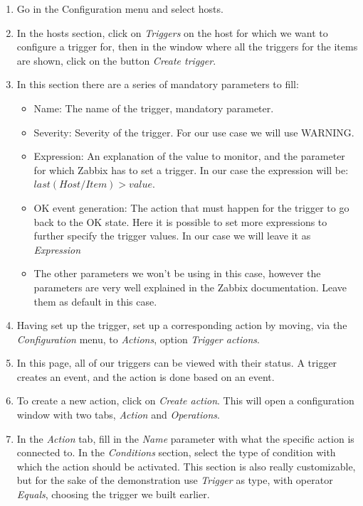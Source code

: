\documentclass[a4paper,11pt]{scrartcl}
\begin{document}
\begin{enumerate}
    \item Go in the Configuration menu and select hosts.
    \item In the hosts section, click on \textit{Triggers} on the host for which we want to configure a trigger for, then in the window where all the triggers for the items are shown, click on the button \textit{Create trigger}.
    \item In this section there are a series of mandatory parameters to fill:
    \begin{itemize}
        \item Name: The name of the trigger, mandatory parameter.
        \item Severity: Severity of the trigger. For our use case we will use WARNING.
        \item Expression: An explanation of the value to monitor, and the parameter for which Zabbix has to set a trigger. In our case the expression will be: $last(Host/Item)>value$. 
        \item OK event generation: The action that must happen for the trigger to go back to the OK state. Here it is possible to set more expressions to further specify the trigger values. In our case we will leave it as \textit{Expression}
        \item The other parameters we won't be using in this case, however the parameters are very well explained in the Zabbix documentation. Leave them as default in this case.
    \end{itemize}
    \item Having set up the trigger, set up a corresponding action by moving, via the \textit{Configuration} menu, to \textit{Actions}, option \textit{Trigger actions}.
    \item In this page, all of our triggers can be viewed with their status. A trigger creates an event, and the action is done based on an event.
    \item To create a new action, click on \textit{Create action}. This will open a configuration window with two tabs, \textit{Action} and \textit{Operations}.
    \item In the \textit{Action} tab, fill in the \textit{Name} parameter with what the specific action is connected to. In the \textit{Conditions} section, select the type of condition with which the action should be activated. This section is also really customizable, but for the sake of the demonstration use \textit{Trigger} as type, with operator \textit{Equals}, choosing the trigger we built earlier.

\end{enumerate}
\end{document}

